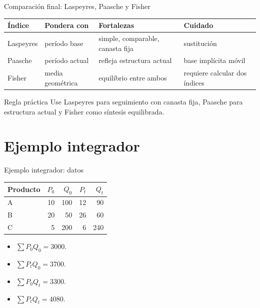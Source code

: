 \documentclass[aspectratio=169,11pt]{beamer}
\begin{document}
\begin{frame}{Comparación final: Laspeyres, Paasche y Fisher}
\small
\begin{center}
\begin{tabular}{p{}p{}p{}p{}}
\toprule
Índice & Pondera con & Fortalezas & Cuidado \\
\midrule
Laspeyres & período base & simple, comparable, canasta fija & sustitución \\
Paasche & período actual & refleja estructura actual & base implícita móvil \\
Fisher & media geométrica & equilibrio entre ambos & requiere calcular dos índices \\
\bottomrule
\end{tabular}
\end{center}
\begin{block}{Regla práctica}
Use Laspeyres para seguimiento con canasta fija, Paasche para estructura actual y Fisher como síntesis equilibrada.
\end{block}
\end{frame}

\section{Ejemplo integrador}

\begin{frame}{Ejemplo integrador: datos}
\small
\begin{center}
\begin{tabular}{lrrrr}
\toprule
Producto & $P_0$ & $Q_0$ & $P_t$ & $Q_t$ \\
\midrule
A & 10 & 100 & 12 & 90 \\
B & 20 & 50 & 26 & 60 \\
C & 5 & 200 & 6 & 240 \\
\bottomrule
\end{tabular}
\end{center}
\begin{itemize}
  \item $\sum P_0Q_0=3000$.
  \item $\sum P_tQ_0=3700$.
  \item $\sum P_0Q_t=3300$.
  \item $\sum P_tQ_t=4080$.
\end{itemize}
\end{frame}
\end{document}
